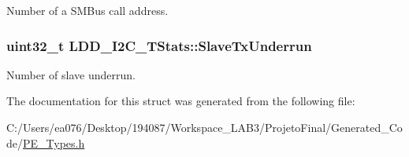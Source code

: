 Number of a S\-M\-Bus call address. \hypertarget{struct_l_d_d___i2_c___t_stats_add2f9914a1ea98c3bf86c0cab84e6a8c}{
\subsubsection[{Slave\-Tx\-Underrun}]{\setlength{\rightskip}{0pt plus 5cm}uint32\-\_\-t L\-D\-D\-\_\-\-I2\-C\-\_\-\-T\-Stats\-::\-Slave\-Tx\-Underrun}}\label{struct_l_d_d___i2_c___t_stats_add2f9914a1ea98c3bf86c0cab84e6a8c}
Number of slave underrun. 

The documentation for this struct was generated from the following file\-:\begin{DoxyCompactItemize}
\item 
C\-:/\-Users/ea076/\-Desktop/194087/\-Workspace\-\_\-\-L\-A\-B3/\-Projeto\-Final/\-Generated\-\_\-\-Code/\hyperlink{_p_e___types_8h}{P\-E\-\_\-\-Types.\-h}\end{DoxyCompactItemize}
